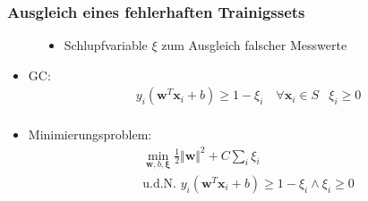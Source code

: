 \begin{frame}
    \frametitle{Ausgleich eines fehlerhaften Trainigssets}

    \begin{figure}[h]
        \begin{minipage}{0.4\textwidth} 
            \begin{figure}[h]
            \end{figure}
        \end{minipage}
        \hfill
        \begin{minipage}{0.4\textwidth}
            \begin{itemize}
                \item Schlupfvariable $\xi$ zum Ausgleich falscher Messwerte
            \end{itemize}
        \end{minipage}
    \end{figure}

    \begin{itemize}
        \item GC:
            \begin{align*}
                & y_i ( \boldsymbol{w}^T \boldsymbol{x}_i + b ) \geq 1 - \xi_i \quad \forall \boldsymbol{x}_i \in S & \xi_i \geq 0\\
            \end{align*}
        \item Minimierungsproblem:
            \begin{align*}
                &\min_{\boldsymbol{w}, b, \boldsymbol{\xi}} \frac{1}{2} \Vert \boldsymbol{w} \Vert^2 + C \sum_i \xi_i \\
                &\text{u.d.N. } y_i ( \boldsymbol{w}^T \boldsymbol{x}_i + b ) \geq 1 - \xi_i \land \xi_i \geq 0 \\
            \end{align*}
    \end{itemize}
\end{frame}

